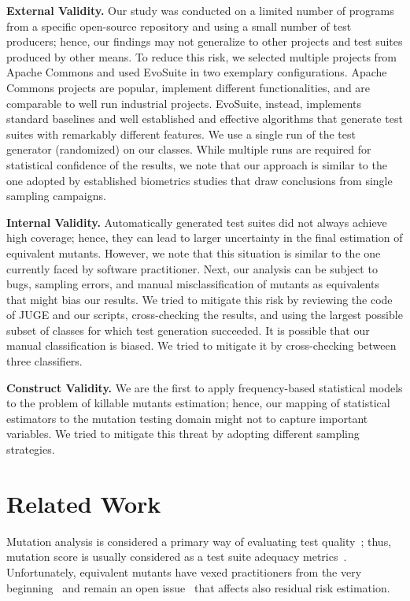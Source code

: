 \documentclass[sigconf]{acmart}
\begin{document}
\noindent\textbf{External Validity.}
Our study was conducted on a limited number of programs from a specific
open-source repository and using a small number of test producers;
hence, our findings
may not generalize to other projects and test suites produced by other means.
To reduce this risk, we selected multiple projects from Apache Commons and
used EvoSuite in two exemplary configurations.
Apache Commons projects are popular, implement different functionalities, and
are comparable to %
well run industrial projects.
EvoSuite, instead, implements standard baselines %
and
well established and effective algorithms %
that generate test suites with remarkably different features.
We use a single run of the test generator (randomized) on our classes.
While multiple runs are required for statistical confidence of the results,
we note that our approach is similar to the one adopted by established biometrics
studies that draw conclusions from single sampling campaigns.

\noindent\textbf{Internal Validity.}
Automatically generated test suites did not always achieve high coverage;
hence, they can lead to larger uncertainty in the final estimation of equivalent mutants. 
However, we note that this situation is similar to the one currently faced by software practitioner. %
Next, our analysis can be subject to bugs, sampling errors, and manual misclassification of mutants
as equivalents
that might bias our results.
We tried to mitigate this risk by reviewing the code of JUGE and our scripts, 
cross-checking the results, and using the largest possible subset of classes for which
test generation succeeded.
It is possible that our manual classification is biased. We tried to mitigate it by cross-checking between three classifiers.

\noindent\textbf{Construct Validity.} We are the first to apply
frequency-based statistical models %
to the problem of killable mutants estimation; hence, 
our mapping of statistical estimators to the mutation testing domain
might not to capture important variables. %
We tried to mitigate this threat by adopting different sampling strategies.

\section{Related Work}
\label{sec:related}
Mutation analysis is considered a primary way of evaluating test quality~\cite{papadakis2019mutation};
thus, mutation score is usually considered as a test suite adequacy metrics~\cite{just2014are,andrews2005is,andrews2006using,daran1996software}. 
Unfortunately, equivalent mutants have vexed practitioners from the very beginning~\cite{budd1982two}
and remain an open issue~\cite{madeyski2014overcoming} that affects also residual risk estimation.
\end{document}
